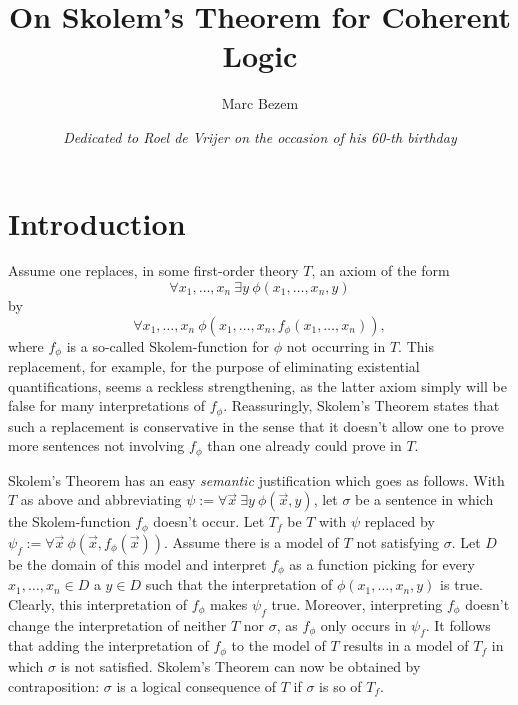 \documentclass[12pt]{article}
\newcommand{\many}[2]{{#1_1},\ldots,{#1_#2}}
\newcommand{\Tf}{T_{\!f}}
\newcommand{\psif}{\psi_{\!f}}
\begin{document}
\title{On Skolem's Theorem for Coherent Logic}
%
\author{Marc Bezem}

\date{\it Dedicated to Roel de Vrijer on the occasion of his 60-th birthday}

\maketitle




\section{Introduction}\label{sec:intro}
Assume one replaces, in some first-order theory $T$, an axiom of the form
\[\forall\many{x}{n}~\exists y~\phi(\many{x}{n},y)\]
by 
\[\forall\many{x}{n}~\phi(\many{x}{n},f_\phi(\many{x}{n})),\]
where $f_\phi$ is a so-called Skolem-function for $\phi$ not occurring in $T$.
This replacement, for example, for the purpose of eliminating existential quantifications,
seems a reckless strengthening, as the latter axiom simply will be false
for many interpretations of $f_\phi$. Reassuringly, 
Skolem's Theorem states that such a replacement 
is conservative in the sense that it doesn't allow one to prove more sentences
not involving $f_\phi$ than one already could prove in $T$.

Skolem's Theorem has an easy \emph{semantic} justification which goes as follows.
With $T$ as above and abbreviating 
$\psi:=\forall\vec{x}~\exists y~\phi(\vec{x},y)$,
let $\sigma$ be a sentence in which the Skolem-function $f_\phi$ doesn't occur. 
Let $\Tf$ be $T$ with $\psi$ replaced by
$\psif:=\forall\vec{x}~\phi(\vec{x},f_\phi(\vec{x}))$.
Assume there is a model of $T$ not satisfying $\sigma$. 
Let $D$ be the domain of this model and interpret
$f_\phi$ as a function picking for every $\many{x}{n}\in D$ a $y\in D$ such that
the interpretation of $\phi(\many{x}{n} ,y)$ is true. Clearly, this interpretation
of $f_\phi$ makes $\psif$ true. Moreover, interpreting $f_\phi$
doesn't change the interpretation of neither $T$ nor $\sigma$, as $f_\phi$
only occurs in $\psif$. It follows that adding the interpretation of
$f_\phi$ to the model of $T$ results in a model of $\Tf$
in which $\sigma$ is not satisfied.
Skolem's Theorem can now be obtained by contraposition: $\sigma$ is a logical
consequence of $T$ if $\sigma$ is so of $\Tf$.
\end{document}
